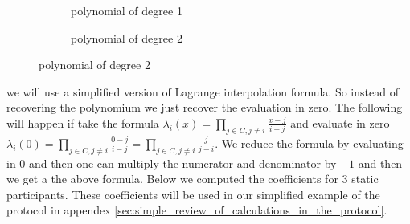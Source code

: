 \begin{figure}[H]
    \centering
    \captionsetup[subfigure]{labelformat=empty}
    \begin{subfigure}[b]{0.3\textwidth}
        \caption{polynomial of degree 1}
    \end{subfigure}
    \qquad %
    \qquad %
    \qquad %
    \qquad %
    \begin{subfigure}[b]{0.3\textwidth}
        \caption{polynomial of degree 2}
    \end{subfigure}
\end{figure}


 we will use a simplified version of Lagrange interpolation formula. So instead of recovering the polynomium we just recover the evaluation in zero. The following will happen if take the formula \begin{math} \lambda_i(x)=\prod\limits_{j\in C,j\neq i}  \frac{x-j}{i-j} \end{math} and evaluate in zero \begin{math} \lambda_i(0)=\prod\limits_{j\in C,j\neq i}  \frac{0-j}{i-j} = \prod\limits_{j\in C,j\neq i} \frac{j}{j-i} \end{math}. We reduce the formula by evaluating in $0$ and then one can multiply the numerator and denominator by $-1$ and then we get a the above formula. Below we computed the coefficients for 3 static participants. These coefficients will be used in our simplified example of the protocol in appendex \ref{sec:simple_review_of_calculations_in_the_protocol}.


